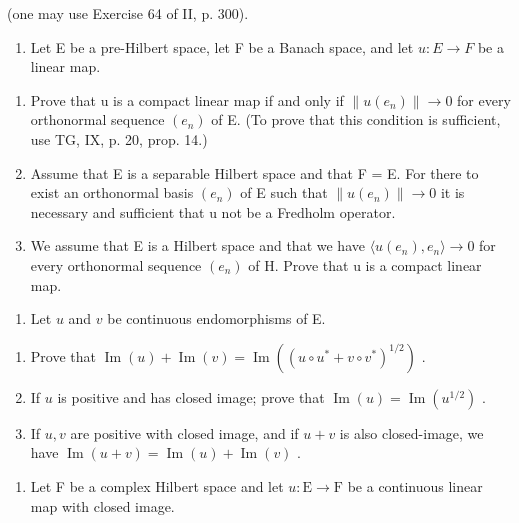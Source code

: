 (one may use Exercise 64 of II, p. 300).

\begin{enumerate}
\def\labelenumi{\arabic{enumi})}
\setcounter{enumi}{5}
\tightlist
\item
  Let E be a pre-Hilbert space, let F be a Banach space, and let \(u: E \rightarrow F\) be a linear map.
\end{enumerate}

\begin{enumerate}
\def\labelenumi{\alph{enumi})}
\item
  Prove that u is a compact linear map if and only if \(\|u(e_{n})\|\to0\) for every orthonormal sequence \((e_{n})\) of E. (To prove that this condition is sufficient, use TG, IX, p. 20, prop. 14.)
\item
  Assume that E is a separable Hilbert space and that F = E. For there to exist an orthonormal basis \((e_{n})\) of E such that \(\|u(e_{n})\| \to 0\) it is necessary and sufficient that u not be a Fredholm operator.
\item
  We assume that E is a Hilbert space and that we have \(\langle u(e_{n}), e_{n} \rangle \to 0\) for every orthonormal sequence \((e_{n})\) of H. Prove that u is a compact linear map.
\end{enumerate}

\begin{enumerate}
\def\labelenumi{\arabic{enumi})}
\setcounter{enumi}{6}
\tightlist
\item
  Let \(u\) and \(v\) be continuous endomorphisms of E.
\end{enumerate}

\begin{enumerate}
\def\labelenumi{\alph{enumi})}
\item
  Prove that \(\operatorname{Im}(u) + \operatorname{Im}(v) = \operatorname{Im}((u \circ u^* + v \circ v^*)^{1/2})\) .
\item
  If \(u\) is positive and has closed image; prove that \(\operatorname{Im}(u) = \operatorname{Im}(u^{1/2})\) .
\item
  If \(u, v\) are positive with closed image, and if \(u + v\) is also closed-image, we have \(\operatorname{Im}(u + v) = \operatorname{Im}(u) + \operatorname{Im}(v)\) .
\end{enumerate}

\begin{enumerate}
\def\labelenumi{\arabic{enumi})}
\setcounter{enumi}{7}
\tightlist
\item
  Let F be a complex Hilbert space and let \(u \colon \mathrm{E} \to \mathrm{F}\) be a continuous linear map with closed image.
\end{enumerate}

